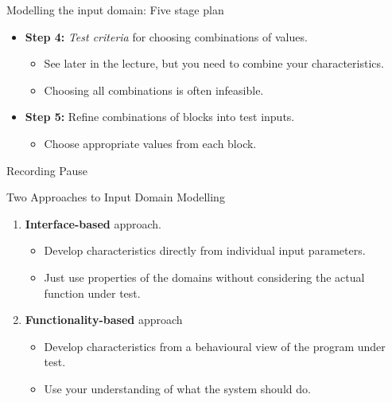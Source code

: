 \documentclass{beamer}
\newcommand{\pauseslide}{\begin{frame}{}
  \begin{center}
    Recording Pause
  \end{center}
  
\end{frame}}
\begin{document}
\begin{frame}{Modelling the input domain: Five stage plan}
  \begin{itemize}
  \item {\bf Step 4:} {\it Test criteria} for choosing combinations of values.
    \begin{itemize}
    \item See later in the lecture, but you need to combine your
      characteristics.
    \item Choosing all combinations is often infeasible.
    \end{itemize}
  \item {\bf Step 5:} Refine combinations of blocks into test inputs.
    \begin{itemize}
    \item Choose appropriate values from each block.
    \end{itemize}
  \end{itemize}
\end{frame}
\pauseslide
\begin{frame}{Two Approaches to Input Domain Modelling}
  \begin{enumerate}
  \item {\bf Interface-based} approach.
    \begin{itemize}
    \item Develop characteristics directly from individual input
      parameters.
    \item Just use properties of the domains without considering the
      actual function under test.
    \end{itemize}
  \item {\bf Functionality-based} approach
    \begin{itemize}
    \item Develop characteristics from a behavioural view of the
      program under test.
    \item Use your understanding of what the system should do. 
    \end{itemize}
  \end{enumerate}
  
\end{frame}
\end{document}

